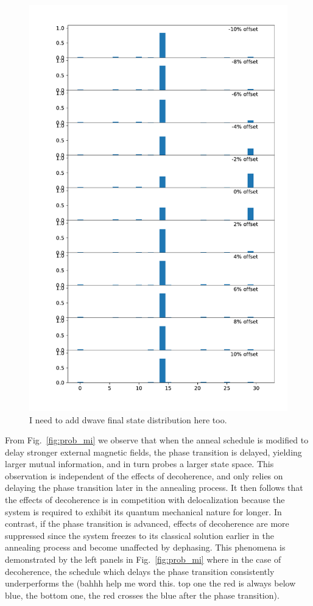 \documentclass[prd,twocolumn,tightenlines,preprintnumbers,showpacs,superscriptaddress,notitlepage,nofootinbib,eqsecnum,floatfix,longbibliography]{revtex4}
\begin{document}
\begin{figure}
	\centering
	\includegraphics[width=\columnwidth]{./figures/final_state_distribution.pdf}
	\caption{{\color{red}I need to add dwave final state distribution here too.}}
	\label{fig:final_state_distribution}
\end{figure}

From Fig.~\ref{fig:prob_mi} we observe that when the anneal schedule is modified to delay stronger external magnetic fields, the phase transition is delayed, yielding larger mutual information, and in turn probes a larger state space. This observation is independent of the effects of decoherence, and only relies on delaying the phase transition later in the annealing process. It then follows that the effects of decoherence is in competition with delocalization because the system is required to exhibit its quantum mechanical nature for longer. In contrast, if the phase transition is advanced, effects of decoherence are more suppressed since the system freezes to its classical solution earlier in the annealing process and {\color{blue}become unaffected by dephasing.} This phenomena is demonstrated by the left panels in Fig.~\ref{fig:prob_mi} where in the case of decoherence, the schedule which delays the phase transition consistently underperforms the (bahhh help me word this. top one the red is always below blue, the bottom one, the red crosses the blue after the phase transition).
\end{document}
